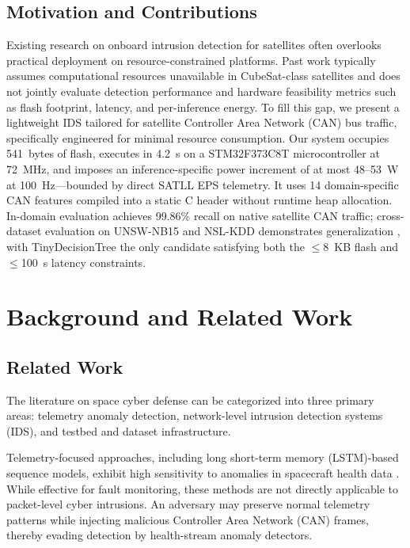 \subsection{Motivation and Contributions}
 
Existing research on onboard intrusion detection for satellites often overlooks practical deployment on resource-constrained platforms. Past work typically assumes computational resources unavailable in CubeSat-class satellites and does not jointly evaluate detection performance and hardware feasibility metrics such as flash footprint, latency, and per-inference energy. To fill this gap, we present a lightweight IDS tailored for satellite Controller Area Network (CAN) bus traffic, specifically engineered for minimal resource consumption. Our system occupies 541~bytes of flash, executes in 4.2~\textmu s on a STM32F373C8T microcontroller at 72~MHz, and imposes an inference-specific power increment of at most 48--53~\textmu W at 100~Hz---bounded by direct SATLL EPS telemetry. It uses 14 domain-specific CAN features compiled into a static C header without runtime heap allocation. In-domain evaluation achieves 99.86\% recall on native satellite CAN traffic; cross-dataset evaluation on UNSW-NB15 and NSL-KDD demonstrates generalization \cite{UNSW2015, NSLKDD2009}, with TinyDecisionTree the only candidate satisfying both the $\leq$8~KB flash and $\leq$100~\textmu s latency constraints.


\section{Background and Related Work}
\label{sec:background}

\subsection{Related Work}

The literature on space cyber defense can be categorized into three primary areas: telemetry anomaly detection, network-level intrusion detection systems (IDS), and testbed and dataset infrastructure.

Telemetry-focused approaches, including long short-term memory (LSTM)-based sequence models, exhibit high sensitivity to anomalies in spacecraft health data \cite{Hundman2018, OPSSAT2025}. While effective for fault monitoring, these methods are not directly applicable to packet-level cyber intrusions. An adversary may preserve normal telemetry patterns while injecting malicious Controller Area Network (CAN) frames, thereby evading detection by health-stream anomaly detectors.

